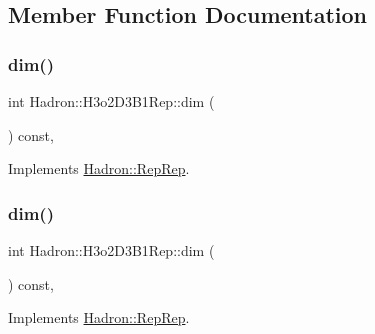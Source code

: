\subsection{Member Function Documentation}
\mbox{\label{structHadron_1_1H3o2D3B1Rep_ad1639313bcbea6b68b3b84d10db0e203}} 
\subsubsection{\texorpdfstring{dim()}{dim()}\hspace{0.1cm}{\footnotesize\ttfamily [1/5]}}
{\footnotesize\ttfamily int Hadron\+::\+H3o2\+D3\+B1\+Rep\+::dim (\begin{DoxyParamCaption}{ }\end{DoxyParamCaption}) const\hspace{0.3cm}{\ttfamily [inline]}, {\ttfamily [virtual]}}



Implements \mbox{\hyperlink{structHadron_1_1RepRep_a92c8802e5ed7afd7da43ccfd5b7cd92b}{Hadron\+::\+Rep\+Rep}}.

\mbox{\label{structHadron_1_1H3o2D3B1Rep_ad1639313bcbea6b68b3b84d10db0e203}} 
\subsubsection{\texorpdfstring{dim()}{dim()}\hspace{0.1cm}{\footnotesize\ttfamily [2/5]}}
{\footnotesize\ttfamily int Hadron\+::\+H3o2\+D3\+B1\+Rep\+::dim (\begin{DoxyParamCaption}{ }\end{DoxyParamCaption}) const\hspace{0.3cm}{\ttfamily [inline]}, {\ttfamily [virtual]}}



Implements \mbox{\hyperlink{structHadron_1_1RepRep_a92c8802e5ed7afd7da43ccfd5b7cd92b}{Hadron\+::\+Rep\+Rep}}.

\mbox{\label{structHadron_1_1H3o2D3B1Rep_ad1639313bcbea6b68b3b84d10db0e203}} 
